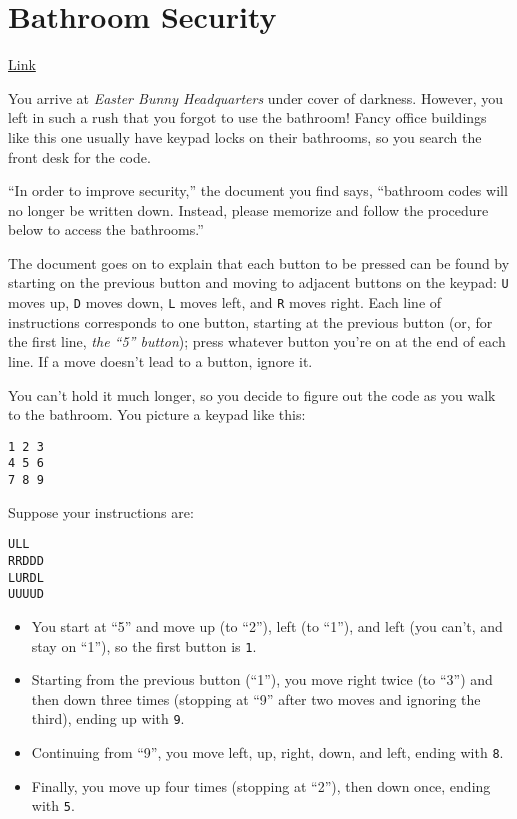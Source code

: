 \chapter{Bathroom Security}\label{bathroom-security}

\href{https://adventofcode.com/2016/day/2}{Link}

You arrive at \emph{Easter Bunny Headquarters} under cover of darkness.
However, you left in such a rush that you forgot to use the bathroom!
Fancy office buildings like this one usually have keypad locks on their
bathrooms, so you search the front desk for the code.

``In order to improve security,'' the document you find says, ``bathroom
codes will no longer be written down. Instead, please memorize and
follow the procedure below to access the bathrooms.''

The document goes on to explain that each button to be pressed can be
found by starting on the previous button and moving to adjacent buttons
on the keypad: \texttt{U} moves up, \texttt{D}
moves down, \texttt{L} moves left, and
\texttt{R} moves right. Each line of instructions
corresponds to one button, starting at the previous button (or, for the
first line, \emph{the ``5'' button}); press whatever button you're on at
the end of each line. If a move doesn't lead to a button, ignore it.

You can't hold it much longer, so you decide to figure out the code as
you walk to the bathroom. You picture a keypad like this:

\begin{verbatim}
1 2 3
4 5 6
7 8 9
\end{verbatim}

Suppose your instructions are:

\begin{verbatim}
ULL
RRDDD
LURDL
UUUUD
\end{verbatim}

\begin{itemize}
\tightlist
\item
  You start at ``5'' and move up (to ``2''), left (to ``1''), and left
  (you can't, and stay on ``1''), so the first button is
  \texttt{1}.
\item
  Starting from the previous button (``1''), you move right twice (to
  ``3'') and then down three times (stopping at ``9'' after two moves
  and ignoring the third), ending up with \texttt{9}.
\item
  Continuing from ``9'', you move left, up, right, down, and left,
  ending with \texttt{8}.
\item
  Finally, you move up four times (stopping at ``2''), then down once,
  ending with \texttt{5}.
\end{itemize}

